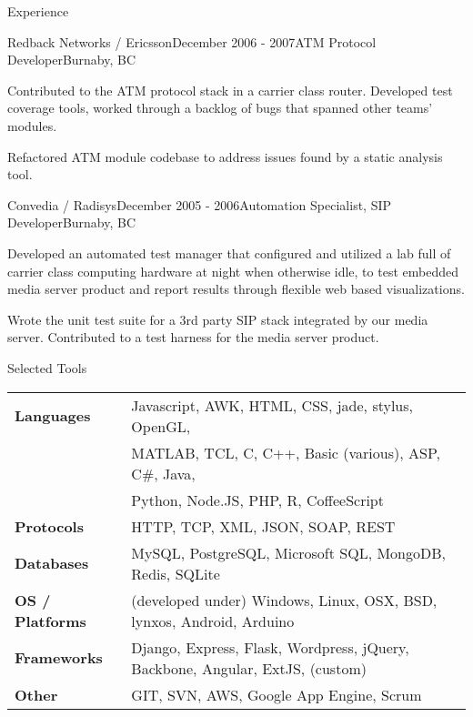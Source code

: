 \documentclass{resume} %
\begin{document}
\begin{rSection}{Experience}

\begin{rSubsection}{Redback Networks / Ericsson}{December 2006 - 2007}{ATM Protocol Developer}{Burnaby, BC}
\item Contributed to the ATM protocol stack in a carrier class router. Developed test coverage tools, worked through a backlog of bugs that spanned other teams’ modules.
\item Refactored ATM module codebase to address issues found by a static analysis tool.

\end{rSubsection}
\begin{rSubsection}{Convedia / Radisys}{December 2005 - 2006}{Automation Specialist, SIP Developer}{Burnaby, BC}
\item Developed an automated test manager that configured and utilized a lab full of carrier class computing hardware at night when otherwise idle, to test embedded media server product and report results through flexible web based visualizations.
\item Wrote the unit test suite for a 3rd party SIP stack integrated by our media server. Contributed to a test harness for the media server product.
\end{rSubsection}

\end{rSection}


\begin{rSection}{Selected Tools}
\begin{tabular}{ @{} >{\bfseries}l @{\hspace{6ex}} l }
Languages & Javascript, AWK, HTML, CSS, jade, stylus, OpenGL, \\
 & MATLAB, TCL, C, C++, Basic (various), ASP, C\#, Java, \\
 & Python, Node.JS, PHP, R, CoffeeScript \\
Protocols & HTTP, TCP, XML, JSON, SOAP, REST \\
Databases & MySQL, PostgreSQL, Microsoft SQL, MongoDB, Redis, SQLite \\
OS / Platforms & (developed under) Windows, Linux, OSX, BSD, lynxos, Android, Arduino \\
Frameworks & Django, Express, Flask, Wordpress, jQuery, Backbone, Angular, ExtJS, (custom) \\
Other & GIT, SVN, AWS, Google App Engine, Scrum \\
\end{tabular}
\end{rSection}
\end{document}
